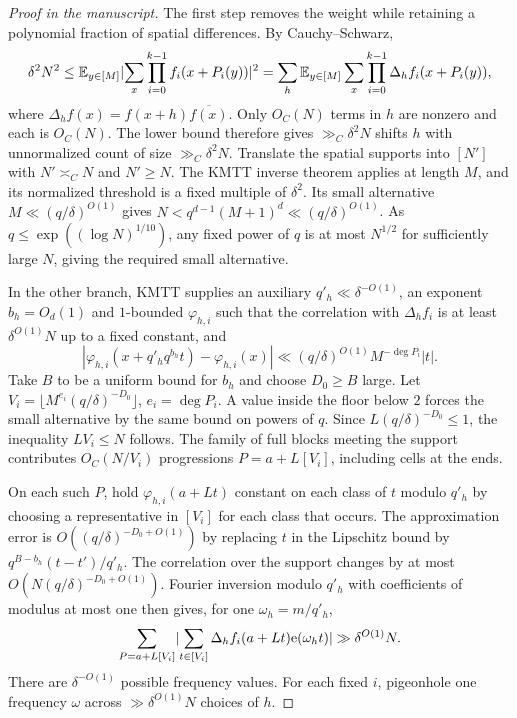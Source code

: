 \begin{proof}[Proof in the manuscript]
\leanok
The first step removes the weight while retaining a polynomial
fraction of spatial differences. By Cauchy--Schwarz,
\[
 \delta^2N^2\le\mathbb E_{y\in[M]}
       \lvert\sum_x\prod_{i=0}^{k-1} f_i(x+P_i(y))\rvert^2
 =\sum_h\mathbb E_{y\in[M]}\sum_x\prod_{i=0}^{k-1}
       \Delta_h f_i(x+P_i(y)),
\]
where $\Delta_h f(x)=f(x+h)\overline{f(x)}$.
Only $O_C(N)$ terms in $h$ are nonzero and each is $O_C(N)$.
The lower bound therefore gives $\gg_C\delta^2N$ shifts $h$
with unnormalized count of size $\gg_C\delta^2N$. Translate
the spatial supports into $[N']$ with $N'\asymp_C N$ and
$N'\ge N$. The KMTT inverse theorem applies at length $M$,
and its normalized threshold is a fixed multiple of $\delta^2$.
Its small alternative $M\ll(q/\delta)^{O(1)}$ gives
$N<q^{d-1}(M+1)^d\ll(q/\delta)^{O(1)}$. As
$q\le\exp((\log N)^{1/10})$, any fixed power of $q$ is at most
$N^{1/2}$ for sufficiently large $N$, giving the required
small alternative.

In the other branch, KMTT supplies an auxiliary
$q'_h\ll\delta^{-O(1)}$, an exponent $b_h=O_d(1)$ and
$1$-bounded $\varphi_{h,i}$ such that the correlation with
$\Delta_hf_i$ is at least $\delta^{O(1)}N$ up to a fixed constant, and
\[
 |\varphi_{h,i}(x+q'_h q^{b_h} t)-\varphi_{h,i}(x)|
   \ll(q/\delta)^{O(1)}M^{-\deg P_i}|t|.
\]
Take $B$ to be a uniform bound for $b_h$ and choose $D_0\ge B$
large. Let $V_i=\lfloor M^{e_i}(q/\delta)^{-D_0}\rfloor$,
$e_i=\deg P_i$. A value inside the floor below $2$ forces the
small alternative by the same bound on powers of $q$.
Since $L(q/\delta)^{-D_0}\le1$, the inequality $LV_i\le N$ follows.
The family of full blocks meeting the support contributes
$O_C(N/V_i)$ progressions $P=a+L[V_i]$, including cells at the ends.

On each such $P$, hold $\varphi_{h,i}(a+Lt)$ constant on each
class of $t$ modulo $q'_h$ by choosing a representative in $[V_i]$
for each class that occurs. The approximation error is
$O((q/\delta)^{-D_0+O(1)})$ by replacing $t$ in the Lipschitz
bound by $q^{B-b_h}(t-t')/q'_h$. The correlation over the
support changes by at most $O(N(q/\delta)^{-D_0+O(1)})$.
Fourier inversion modulo $q'_h$ with coefficients of modulus at
most one then gives, for one $\omega_h=m/q'_h$,
\[
 \sum_{P=a+L[V_i]}
      \lvert\sum_{t\in[V_i]}\Delta_h f_i(a+Lt)\mathrm e(\omega_h t)\rvert
      \gg\delta^{O(1)}N .
\]
There are $\delta^{-O(1)}$ possible frequency values. For each
fixed $i$, pigeonhole one frequency $\omega$ across
$\gg\delta^{O(1)}N$ choices of $h$.


\end{proof}

